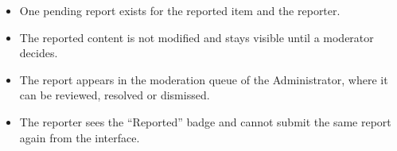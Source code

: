 \begin{itemize}[leftmargin=1.6em,topsep=3pt,itemsep=2pt,parsep=0pt,label=$\bullet$]
      \item One pending report exists for the reported item and the reporter.
      \item The reported content is not modified and stays visible until a moderator
            decides.
      \item The report appears in the moderation queue of the Administrator, where it can
            be reviewed, resolved or dismissed.
      \item The reporter sees the ``Reported'' badge and cannot submit the same report
            again from the interface.
\end{itemize}
